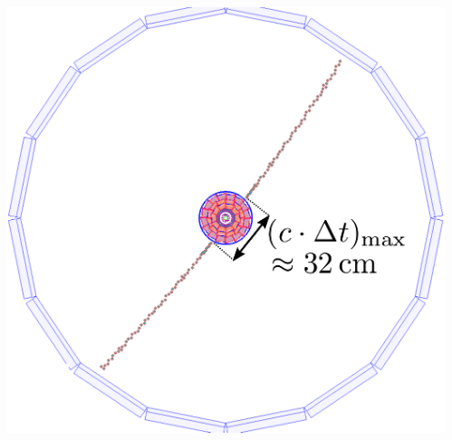 \documentclass[18pt]{beamer}
\begin{document}
\begin{frame}
\begin{columns}
    \begin{column}{0.35\textwidth}
    \end{column}
    \begin{column}{0.25\textwidth}
      \includegraphics[width=\textwidth]{figures/b2display_screenshots/gcr_mc_2017-08_run4006_evt1_twotrackevent_annotaded.pdf}
    \end{column}
  \end{columns}
\end{frame}
\end{document}
